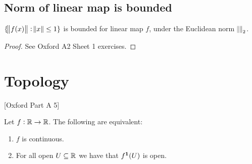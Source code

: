 \subsection{Norm of linear map is bounded}
\begin{theorem}
  $\{\norm{f(x)} : \norm{x} \leq 1\}$ is bounded for linear map $f$, under the Euclidean norm
  $\norm{}_2$.
\end{theorem}

\begin{proof}
  See Oxford A2 Sheet 1 exercises.
\end{proof}

\section{Topology}
[Oxford Part A 5]



\begin{theorem*}
  Let $f:\mathbb{R} \to \mathbb{R}$. The following are equivalent:
  \begin{enumerate}
  \item $f$ is continuous.

  \item For all open $U \subseteq \mathbb{R}$ we have that $f^{\mathbf 1}(U)$ is open.
  \end{enumerate}
\end{theorem*}

